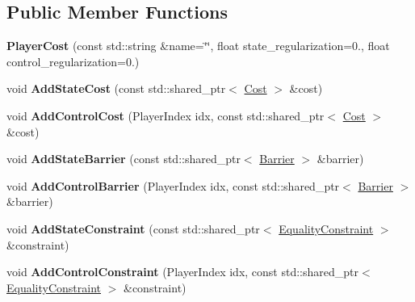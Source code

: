 \subsection*{Public Member Functions}
\begin{DoxyCompactItemize}
\item 
{\bfseries Player\+Cost} (const std\+::string \&name=\char`\"{}\char`\"{}, float state\+\_\+regularization=0., float control\+\_\+regularization=0.)\hypertarget{classilqgames_1_1_player_cost_a271f96af8eeac9138b0832239ca62437}{}\label{classilqgames_1_1_player_cost_a271f96af8eeac9138b0832239ca62437}

\item 
void {\bfseries Add\+State\+Cost} (const std\+::shared\+\_\+ptr$<$ \hyperlink{classilqgames_1_1_cost}{Cost} $>$ \&cost)\hypertarget{classilqgames_1_1_player_cost_a3135d5f4c7722edc1ae385e0ecafcc87}{}\label{classilqgames_1_1_player_cost_a3135d5f4c7722edc1ae385e0ecafcc87}

\item 
void {\bfseries Add\+Control\+Cost} (Player\+Index idx, const std\+::shared\+\_\+ptr$<$ \hyperlink{classilqgames_1_1_cost}{Cost} $>$ \&cost)\hypertarget{classilqgames_1_1_player_cost_aba4df0e6414aba024c86bf77fe57f819}{}\label{classilqgames_1_1_player_cost_aba4df0e6414aba024c86bf77fe57f819}

\item 
void {\bfseries Add\+State\+Barrier} (const std\+::shared\+\_\+ptr$<$ \hyperlink{classilqgames_1_1_barrier}{Barrier} $>$ \&barrier)\hypertarget{classilqgames_1_1_player_cost_a96eacffc74e2f7574d6c9c1296a6729c}{}\label{classilqgames_1_1_player_cost_a96eacffc74e2f7574d6c9c1296a6729c}

\item 
void {\bfseries Add\+Control\+Barrier} (Player\+Index idx, const std\+::shared\+\_\+ptr$<$ \hyperlink{classilqgames_1_1_barrier}{Barrier} $>$ \&barrier)\hypertarget{classilqgames_1_1_player_cost_af00870025b9bff184c121ed28712eff2}{}\label{classilqgames_1_1_player_cost_af00870025b9bff184c121ed28712eff2}

\item 
void {\bfseries Add\+State\+Constraint} (const std\+::shared\+\_\+ptr$<$ \hyperlink{classilqgames_1_1_equality_constraint}{Equality\+Constraint} $>$ \&constraint)\hypertarget{classilqgames_1_1_player_cost_ac5c9248e4ecb96a6d1e49ccef9a5c545}{}\label{classilqgames_1_1_player_cost_ac5c9248e4ecb96a6d1e49ccef9a5c545}

\item 
void {\bfseries Add\+Control\+Constraint} (Player\+Index idx, const std\+::shared\+\_\+ptr$<$ \hyperlink{classilqgames_1_1_equality_constraint}{Equality\+Constraint} $>$ \&constraint)\hypertarget{classilqgames_1_1_player_cost_abb5f7c1664e4cba0e789047ace875eac}{}\label{classilqgames_1_1_player_cost_abb5f7c1664e4cba0e789047ace875eac}


\end{DoxyCompactItemize}
